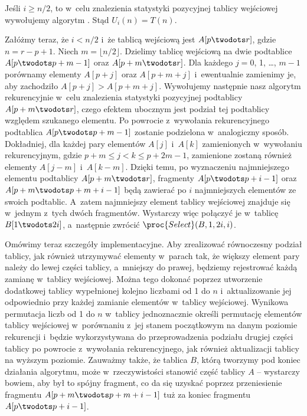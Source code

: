 
\subproblem %

\noindent Jeśli $i\ge n/2$, to w~celu znalezienia  statystyki pozycyjnej tablicy wejściowej wywołujemy algorytm .
Stąd $U_i(n)=T(n)$.

Załóżmy teraz, że $i<n/2$ i~że tablicą wejściową jest $A[p\twodots r]$, gdzie $n=r-p+1$.
Niech $m=\lfloor n/2\rfloor$.
Dzielimy tablicę wejściową na dwie podtablice $A[p\twodots p+m-1]$ oraz $A[p+m\twodots r]$.
Dla każdego $j=0$, 1, \dots, $m-1$ porównamy elementy $A[p+j]$ oraz $A[p+m+j]$ i~ewentualnie zamienimy je, aby zachodziło $A[p+j]>A[p+m+j]$.
Wywołujemy następnie nasz algorytm rekurencyjnie w~celu znalezienia  statystyki pozycyjnej podtablicy $A[p+m\twodots r]$, czego efektem ubocznym jest podział tej podtablicy względem szukanego elementu.
Po powrocie z~wywołania rekurencyjnego podtablica $A[p\twodots p+m-1]$ zostanie podzielona w~analogiczny sposób.
Dokładniej, dla każdej pary elementów $A[j]$ i~$A[k]$ zamienionych w~wywołaniu rekurencyjnym, gdzie $p+m\le j<k\le p+2m-1$, zamienione zostaną również elementy $A[j-m]$ i~$A[k-m]$.
Dzięki temu, po wyznaczeniu  najmniejszego elementu podtablicy $A[p+m\twodots r]$, fragmenty $A[p\twodots p+i-1]$ oraz $A[p+m\twodots p+m+i-1]$ będą zawierać po $i$ najmniejszych elementów ze swoich podtablic.
A~zatem  najmniejszy element tablicy wejściowej znajduje się w~jednym z~tych dwóch fragmentów.
Wystarczy więc połączyć je w~tablicę $B[1\twodots2i]$, a~następnie zwrócić $\proc{Select}(B,1,2i,i)$.

Omówimy teraz szczegóły implementacyjne.
Aby zrealizować równoczesny podział tablicy, jak również utrzymywać elementy w~parach tak, że większy element pary należy do lewej części tablicy, a~mniejszy do prawej, będziemy rejestrować każdą zamianę w~tablicy wejściowej.
Można tego dokonać poprzez utworzenie dodatkowej tablicy  wypełnionej kolejno liczbami od 1 do $n$ i~aktualizowanie jej odpowiednio przy każdej zamianie elementów w~tablicy wejściowej.
Wynikowa permutacja liczb od 1 do $n$ w~tablicy  jednoznacznie określi permutację elementów tablicy wejściowej w~porównaniu z~jej stanem początkowym na danym poziomie rekurencji i~będzie wykorzystywana do przeprowadzenia podziału drugiej części tablicy po powrocie z~wywołania rekurencyjnego, jak również aktualizacji tablicy  na wyższym poziomie.
Zauważmy także, że tablica $B$, którą tworzymy pod koniec działania algorytmu, może w~rzeczywistości stanowić część tablicy $A$ -- wystarczy bowiem, aby był to spójny fragment, co da się uzyskać poprzez przeniesienie fragmentu $A[p+m\twodots p+m+i-1]$ tuż za koniec fragmentu $A[p\twodots p+i-1]$.


